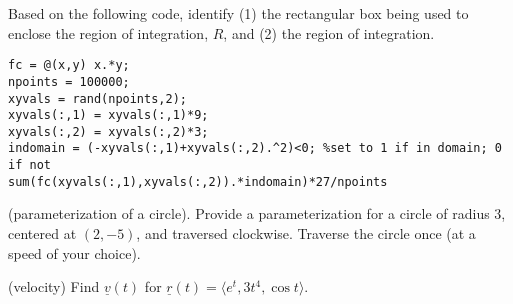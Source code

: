 \documentclass[12pt,letterpaper,noanswers]{exam}
\newcommand{\mb}[1]{\underline{#1}}
\begin{document}
 \pdfpageheight 11in 
  \pdfpagewidth 8.5in



\begin{questions}
\item Based on the following code, identify (1) the rectangular box being used to enclose the region of integration, $R$, and (2) the region of integration.

\begin{lstlisting}
fc = @(x,y) x.*y;
npoints = 100000;
xyvals = rand(npoints,2);
xyvals(:,1) = xyvals(:,1)*9;
xyvals(:,2) = xyvals(:,2)*3;
indomain = (-xyvals(:,1)+xyvals(:,2).^2)<0; %set to 1 if in domain; 0 if not
sum(fc(xyvals(:,1),xyvals(:,2)).*indomain)*27/npoints
\end{lstlisting}

\vfill

\item (parameterization of a circle). Provide a parameterization for a circle of radius $3$, centered at $(2,-5)$, and traversed clockwise.  Traverse the circle once (at a speed of your choice).
\vfill

\item (velocity) Find $\mb v(t)$ for $\mb{r}(t) = \langle e^t, 3t^4, \cos t\rangle$.

\vfill

\end{questions}
\end{document}
